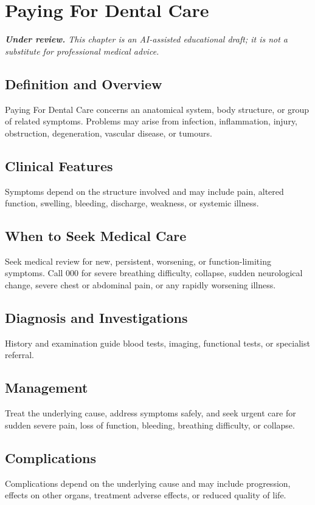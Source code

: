 \chapter{Paying For Dental Care}

\medskip
\noindent\textit{\textbf{Under review.} This chapter is an AI-assisted educational draft; it is not a substitute for professional medical advice.}

\section*{Definition and Overview}
Paying For Dental Care concerns an anatomical system, body structure, or group of related symptoms. Problems may arise from infection, inflammation, injury, obstruction, degeneration, vascular disease, or tumours.

\section*{Clinical Features}
Symptoms depend on the structure involved and may include pain, altered function, swelling, bleeding, discharge, weakness, or systemic illness.

\section*{When to Seek Medical Care}
Seek medical review for new, persistent, worsening, or function-limiting symptoms. Call 000 for severe breathing difficulty, collapse, sudden neurological change, severe chest or abdominal pain, or any rapidly worsening illness.

\section*{Diagnosis and Investigations}
History and examination guide blood tests, imaging, functional tests, or specialist referral.

\section*{Management}
Treat the underlying cause, address symptoms safely, and seek urgent care for sudden severe pain, loss of function, bleeding, breathing difficulty, or collapse.

\section*{Complications}
Complications depend on the underlying cause and may include progression, effects on other organs, treatment adverse effects, or reduced quality of life.

